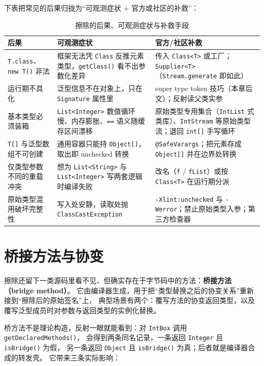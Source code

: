 \documentclass[12pt,a4paper,fontset=fandol]{ctexbook}
\newcommand{\kw}[1]{\texttt{#1}}
\begin{document}
下表把常见的后果归拢为“可观测症状 + 官方或社区的补救”：

\begin{table}[!htbp]
\centering
\caption{擦除的后果、可观测症状与补救手段}
\begin{tabularx}{0.80\textwidth}{>{\raggedright\arraybackslash}p{}>{\raggedright\arraybackslash}p{}>{\raggedright\arraybackslash}X}
\toprule
后果 & 可观测症状 & 官方/社区补救 \\
\midrule
\kw{T.class}、\kw{new T()} 非法 & 框架无法凭 \kw{Class} 反推元素类型，\kw{getClass()} 看不出参数化差异 & 传入 \kw{Class<T>} 或工厂；\kw{Supplier<T>}（\kw{Stream.generate} 即如此） \\
运行期不具化 & 泛型信息不在对象上，只在 \kw{Signature} 属性里 & super type token 技巧（本章后文）；反射读父类实参 \\
基本类型必须装箱 & \kw{List<Integer>} 数值循环慢、内存膨胀、\kw{==} 语义随缓存区间漂移 & 原始类型专用集合（\kw{IntList} 式类库）、\kw{IntStream} 等原始类型流；退回 \kw{int[]} 手写循环 \\
\kw{T[]} 与泛型数组不可创建 & 通用容器只能持 \kw{Object[]}，取出即 unchecked 转换 & \kw{@SafeVarargs}；把元素存成 \kw{Object[]} 并在边界处转换 \\
仅类型参数不同的重载冲突 & 想为 \kw{List<String>} 与 \kw{List<Integer>} 写两套逻辑时编译失败 & 改名（\kw{f} / \kw{fList}）或按 \kw{Class<T>} 在运行期分派 \\
原始类型混用破坏完整性 & 写入处安静，读取处抛 \kw{ClassCastException} & \kw{-Xlint:unchecked} 与 \kw{-Werror}；禁止原始类型入参；第三方检查器 \\
\bottomrule
\end{tabularx}
\end{table}

\section{桥接方法与协变}

擦除还留下一类源码里看不见、但确实存在于字节码中的方法：\textbf{桥接方法（bridge method）}。
它由编译器生成，用于把“类型替换之后的协变关系”重新接到“擦除后的原始签名”上，
典型场景有两个：覆写方法的协变返回类型，以及覆写泛型成员时对参数与返回类型的实例化替换。

桥方法不是理论构造，反射一眼就能看到：对 \kw{IntBox} 调用 \kw{getDeclaredMethods()}，
会得到两条同名记录，一条返回 \kw{Integer} 且 \kw{isBridge()} 为假，
另一条返回 \kw{Object} 且 \kw{isBridge()} 为真；后者就是编译器合成的转发壳。
它带来三条实际影响：
\end{document}

